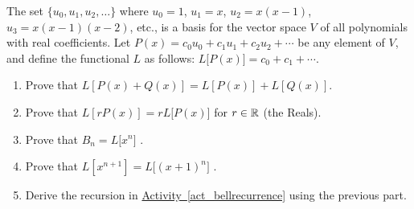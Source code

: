 \documentclass{book}
\begin{document}
\setcounter{project}{302}
\addtocounter{project}{-1}
\begin{activity}[]\label{activity-295}
\hypertarget{p-1559}{}%
The set \(\{u_{0}, u_{1}, u_{2}, \ldots \}\) where \(u_{0} = 1\), \(u_{1} = x\), \(u_{2} = x(x - 1)\), \(u_{3} = x(x - 1)(x - 2)\), etc., is a basis for the vector space \(V\) of all polynomials with real coefficients. Let \(P(x) = c_{0}u_{0} + c_{1}u_{1} + c_{2}u_{2} + \cdots\) be any element of \(V\), and define the functional \(L\) as follows: \(L\lbrack P(x)\rbrack = c_{0} + c_{1} + \cdots\).%
\par
\hypertarget{p-1560}{}%
\leavevmode%
\begin{enumerate}
\item\hypertarget{li-57}{}\hypertarget{p-1561}{}%
Prove that \(L\left\lbrack P\left( x \right) + Q\left( x \right) \right\rbrack = L\left\lbrack P\left( x \right) \right\rbrack + L\left\lbrack Q\left( x \right) \right\rbrack.\)%
\item\hypertarget{li-58}{}\hypertarget{p-1562}{}%
Prove that \(L\left\lbrack rP \left( x \right) \right\rbrack = rL\lbrack P\left( x \right)\rbrack\) for \(r \in \mathbb R\) (the Reals).%
\item\hypertarget{li-59}{}\hypertarget{p-1563}{}%
Prove that \(B_{n} = L\lbrack x^{n}\rbrack\) .%
\item\hypertarget{li-60}{}\hypertarget{p-1564}{}%
Prove that \(L\left\lbrack x^{n + 1} \right\rbrack = L\lbrack\left( x + 1 \right)^{n}\rbrack\) .%
\item\hypertarget{li-61}{}\hypertarget{p-1565}{}%
Derive the recursion in \hyperref[act_bellrecurrence]{Activity~\ref{act_bellrecurrence}} using the previous part.%
\end{enumerate}
%
\end{activity}
\end{document}
